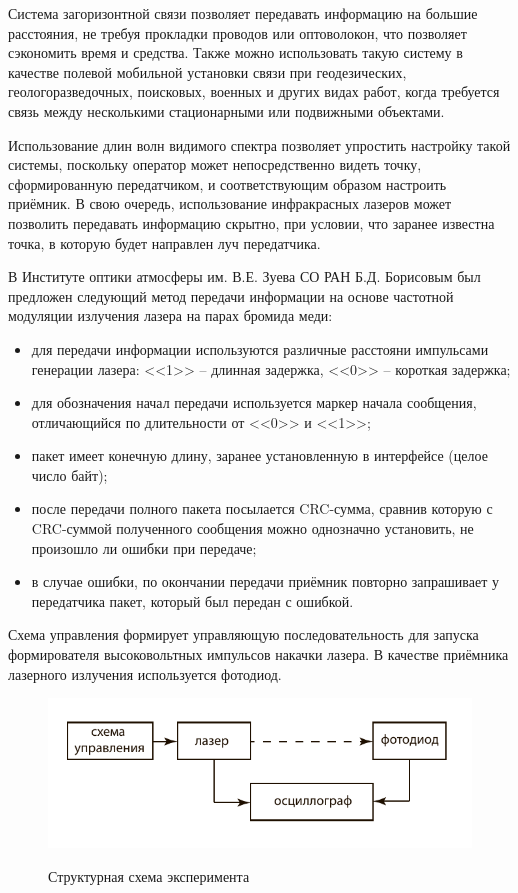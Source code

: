 \documentclass[14pt,pscyr,titlepage]{hedreport}
\begin{document}
		Система загоризонтной связи позволяет передавать информацию на 
		большие расстояния, не требуя прокладки проводов или оптоволокон, 
		что позволяет сэкономить время и средства. Также можно использовать 
		такую систему в качестве полевой мобильной установки связи при 
		геодезических, геологоразведочных, поисковых, военных и других 
		видах работ, когда требуется связь между несколькими стационарными 
		или подвижными объектами.

		Использование длин волн видимого спектра позволяет упростить настройку 
		такой системы, поскольку оператор может непосредственно видеть 
		точку, сформированную передатчиком, и соответствующим образом 
		настроить приёмник. В свою очередь, использование инфракрасных 
		лазеров может позволить передавать информацию скрытно, при условии, 
		что заранее известна точка, в которую будет направлен луч передатчика.

		В Институте оптики атмосферы им. В.Е. Зуева СО РАН Б.Д. Борисовым был 
		предложен следующий метод передачи информации на основе частотной 
		модуляции излучения лазера на парах бромида меди:
		\begin{itemize}\itemsep-2pt
			\item для передачи информации используются различные расстояни 
				импульсами генерации лазера: <<1>> -- длинная задержка, 
				<<0>> -- короткая задержка;
			\item для обозначения начал передачи используется маркер 
				начала сообщения, отличающийся по длительности от <<0>> и 
				<<1>>;
			\item пакет имеет конечную длину, заранее установленную в 
				интерфейсе (целое число байт);
			\item после передачи полного пакета посылается CRC-сумма, сравнив 
				которую с CRC-суммой полученного сообщения можно однозначно 
				установить, не произошло ли ошибки при передаче;
			\item в случае ошибки, по окончании передачи приёмник повторно 
				запрашивает у передатчика пакет, который был передан с ошибкой.
		\end{itemize}


		Схема управления формирует управляющую последовательность для запуска 
		формирователя высоковольтных импульсов накачки лазера. В качестве 
		приёмника лазерного излучения используется фотодиод.

		\begin{figure}[!ht]
			\center
			\includegraphics[width=.8\textwidth]{experiment} \\
			\caption{Структурная схема эксперимента}
		\end{figure}
\end{document}
